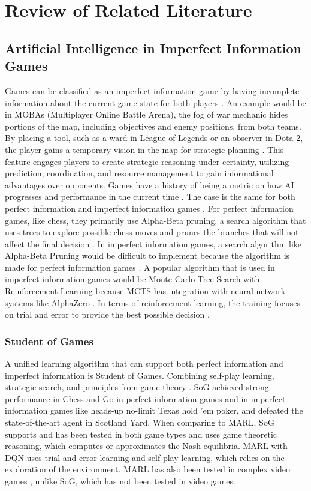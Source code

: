 \chapter{Review of Related Literature}
\section{Artificial Intelligence in Imperfect Information Games}
Games can be classified as an imperfect information game by having incomplete information about the current game state for both players \cite{StudeGame, 2509_03682v1}. An example would be in MOBAs (Multiplayer Online Battle Arena), the fog of war mechanic hides portions of the map, including objectives and enemy positions, from both teams. By placing a tool, such as a ward in League of Legends or an observer in Dota 2, the player gains a temporary vision in the map for strategic planning \cite{WARDS}. This feature engages players to create strategic reasoning under certainty, utilizing prediction, coordination, and resource management to gain informational advantages over opponents. Games have a history of being a metric on how AI progresses and performance in the current time \cite{StudeGame, GamePer}. The case is the same for both perfect information and imperfect information games \cite{StudeGame}. For perfect information games, like chess, they primarily use Alpha-Beta pruning, a search algorithm that uses trees to explore possible chess moves and prunes the branches that will not affect the final decision \cite{alphabeta}. In imperfect information games, a search algorithm like Alpha-Beta Pruning would be difficult to implement because the algorithm is made for perfect information games \cite{alphabe}. A popular algorithm that is used in imperfect information games would be Monte Carlo Tree Search with Reinforcement Learning because MCTS has integration with neural network systems like AlphaZero \cite{AIAgent, AlphaStratego}. In terms of reinforcement learning, the training focuses on trial and error to provide the best possible decision \cite{comprel}.


\subsection{Student of Games}
A unified learning algorithm that can support both perfect information and imperfect information is Student of Games. Combining self-play learning, strategic search, and principles from game theory \cite{StudeGame}. SoG achieved strong performance in Chess and Go in perfect information games and in imperfect information games like heads-up no-limit Texas hold ’em poker, and defeated the state-of-the-art agent in Scotland Yard. When comparing to MARL, SoG supports and has been tested in both game types and uses game theoretic reasoning, which computes or approximates the Nash equilibria. MARL with DQN uses trial and error learning and self-play learning, which relies on the exploration of the environment. MARL has also been tested in complex video games \cite{2509_03682v1}, unlike SoG, which has not been tested in video games.

